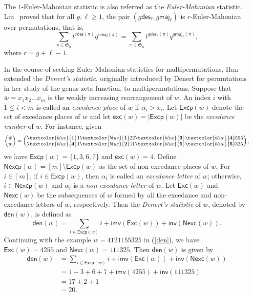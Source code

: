 \documentclass[12pt]{article}
\def\blue{\textcolor{blue}}
\def\blue{\textcolor{blue}}
\numberwithin{equation}{section}
\def\blue{\textcolor{blue}}
\def\blue{\textcolor{blue}}
\theoremstyle{plain}
\def\des{\mathsf{des}}
\def\maj{\mathsf{maj}}
\def\exc{\mathsf{exc}}
\def\den{\mathsf{den}}
\def\Exc{\mathsf{Exc}}
\def\Nexc{\mathsf{Nexc}}
\def\Nexcp{\mathsf{Nexcp}}
\def\Excp{\mathsf{Excp}}
\def\inv{\mathsf{inv}}
\def\imv{\mathsf{imv}}
\begin{document}
	The $1$-Euler-Mahonian statistic  is also referred as the {\em Euler-Mahonian} statistic. 
	Liu~\cite{Liujcta}  proved that  for all $g,\ell\geq 1$,  the pair $(g\des_{\ell}, g\maj_{\ell})$ is $r$-Euler-Mahonian
over permutations, that is, 	\begin{equation}\label{eq-r-Euler}
		\sum_{\pi\in \mathfrak{S}_n} t^{r\des(\pi)}q^{r\maj(\pi)} =\sum_{\pi\in \mathfrak{S}_n} t^{g\des_\ell(\pi)}q^{g\maj_{\ell}(\pi)},  
	\end{equation}
	where $r=g+\ell-1$. 
	
	
	In the course of seeking  Euler-Mahonian statistics for multipermutations, Han \cite{Han1} extended  the {\em Denert's statistic}, originally  introduced by Denert \cite{Denert}  for  permutations in  her study of the genus zeta function,   to multipermutations.  
	Suppose that    $\bar{w}=x_1 x_2 \ldots x_m$ is the weakly increasing rearrangement of $w$.  An index $i$ with  $1\leq i < m$  is called an {\em excedance place}
	of $w$ if $\alpha_i > x_i$. Let $\Excp(w)$  denote the set of excedance places of $w$ and let $\exc(w)=|\Excp(w)|$ be the {\em excedance number} of $w$.  For instance, given   
	\begin{equation}\label{den}
	\begin{pmatrix}
		\bar{w}\\
		w
	\end{pmatrix}
	=
	\begin{pmatrix}
		\blue{\bf1}1\blue{\bf1}22\blue{\bf3}\blue{\bf4}555\\
		\blue{\bf4}1\blue{\bf2}11\blue{\bf5}\blue{\bf5}325 
	\end{pmatrix}, 
	\end{equation}
	 we have $\Excp(w)=\{1,3,6,7\}$  and $\exc(w)=4$.  Define $\Nexcp(w)=[m]\setminus\Excp(w)$ as   the set of non-excedance places of $w$. For $i\in[m]$, if $i\in\Excp(w)$, then $\alpha_i$ is called an {\em excedance letter} of $w$; otherwise, $i\in\Nexcp(w)$ and $\alpha_i$ is a {\em non-excedance letter} of $w$. Let $\Exc(w)$ and   $\Nexc(w)$ be the subsequences of $w$ formed by all the  excedance  and non-excedance letters of $w$, respectively. Then the {\em Denert's statistic} of $w$, denoted by $\den(w)$, is defined as
	$$
	\den(w)=\sum\limits_{i\in \Excp(w)}i+{\imv}(\Exc(w))+{\inv}(\Nexc(w)).
	$$
	Continuing with the example $w=4121155325$ in (\ref{den}), we have
	$\Exc(w)=4255$  and $\Nexc(w)=111325$.
	Then $\den(w)$ is given by 
	$$
	\begin{array}{ll}
		\den(w)
		&=\sum\limits_{i\in \Excp(w)}i+{\imv}(\Exc(w))+{\inv}(\Nexc(w))\\
		&=1+3+6+7+{\imv}(4255)+{\inv}(111325)\\
		&=17+2+1\\
		&=20.
	\end{array}
	$$
	
\end{document}
